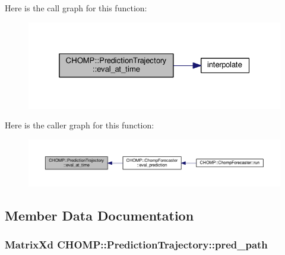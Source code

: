 Here is the call graph for this function\+:
\nopagebreak
\begin{figure}[H]
\begin{center}
\leavevmode
\includegraphics[width=325pt]{struct_c_h_o_m_p_1_1_prediction_trajectory_a3e50b3be07e9531449128eae47c60442_cgraph}
\end{center}
\end{figure}




Here is the caller graph for this function\+:
\nopagebreak
\begin{figure}[H]
\begin{center}
\leavevmode
\includegraphics[width=350pt]{struct_c_h_o_m_p_1_1_prediction_trajectory_a3e50b3be07e9531449128eae47c60442_icgraph}
\end{center}
\end{figure}




\subsection{Member Data Documentation}
\subsubsection[{\texorpdfstring{pred\+\_\+path}{pred_path}}]{\setlength{\rightskip}{0pt plus 5cm}Matrix\+Xd C\+H\+O\+M\+P\+::\+Prediction\+Trajectory\+::pred\+\_\+path}\hypertarget{struct_c_h_o_m_p_1_1_prediction_trajectory_af07e1c23267f79f9e7ec029bcbb246b8}{}\label{struct_c_h_o_m_p_1_1_prediction_trajectory_af07e1c23267f79f9e7ec029bcbb246b8}


